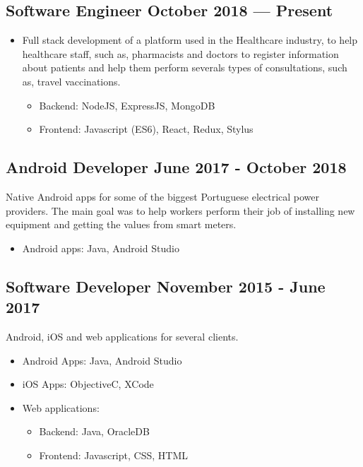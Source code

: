 \subsection{{Software Engineer \hfill October 2018 --- Present}}

\begin{itemize}
    \item Full stack development of a platform used in the Healthcare industry,
	to help healthcare staff, such as, pharmacists 
	and doctors to register information about patients and 
	help them perform severals types of consultations, 
	such as, travel vaccinations.
    \begin{itemize}
        \item Backend: NodeJS, ExpressJS, MongoDB
        \item Frontend: Javascript (ES6), React, Redux, Stylus
    \end{itemize}
\end{itemize}

\subsection{{Android Developer \hfill June 2017 - October 2018}}
\begin{zitemize}
\item Native Android apps for some of the biggest Portuguese 
electrical power providers. 
The main goal was to help workers perform their job of 
installing new equipment and getting the values 
from smart meters.
\begin{itemize}
    \item Android apps: Java, Android Studio
\end{itemize}
\end{zitemize}

\subsection{{Software Developer \hfill November 2015 - June 2017}}
\begin{zitemize}
\item Android, iOS and web applications for several clients.
\begin{itemize}
    \item Android Apps: Java, Android Studio
    \item iOS Apps: ObjectiveC, XCode
    \item Web applications:
    \begin{itemize}
        \item Backend: Java, OracleDB
	    \item Frontend: Javascript, CSS, HTML
    \end{itemize}
\end{itemize}
\end{zitemize}

